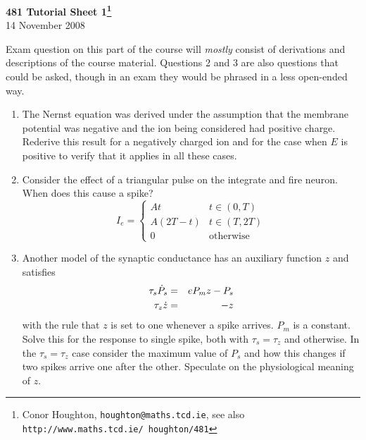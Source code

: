 \documentclass[12pt]{article}
\begin{document}
\begin{center}
{\bf 481 Tutorial Sheet 1\footnote{Conor Houghton, {\tt houghton@maths.tcd.ie}, see also {\tt http://www.maths.tcd.ie/ houghton/481}}}\\[1cm]{} 14 November 2008
\end{center}

\noindent Exam question on this part of the course will {\sl mostly} consist of derivations and descriptions of the course material. Questions 2 and 3 are also questions that could be asked, though in an exam they would be phrased in a less open-ended way.

\begin{enumerate}
\item The Nernst equation was derived under the assumption that the
  membrane potential was negative and the ion being considered had
  positive charge. Rederive this result for a negatively charged ion
  and for the case when $E$ is positive to verify that it applies in
  all these cases.

\item Consider the effect of a triangular pulse on the integrate and fire neuron. When does this cause a spike?
\begin{equation}
I_e=\left\{\begin{array}{ll}At&t\in(0,T)\\
                            A(2T-t)&t\in(T,2T)\\
                             0&\mbox{otherwise}
\end{array}\right.
\end{equation}

\item Another model of the synaptic conductance has an auxiliary function $z$ and satisfies
\begin{eqnarray}
\tau_s\dot{P}_s&=&eP_mz-P_s\cr
\tau_z\dot{z}&=&-z
\end{eqnarray}
with the rule that $z$ is set to one whenever a spike arrives. $P_m$ is a constant. Solve this for the response to single spike, both with $\tau_s=\tau_z$ and otherwise. In the $\tau_s=\tau_z$ case consider the maximum value of $P_s$ and how this changes if two spikes arrive one after the other. Speculate on the physiological meaning of $z$.




\end{enumerate}
\end{document}
